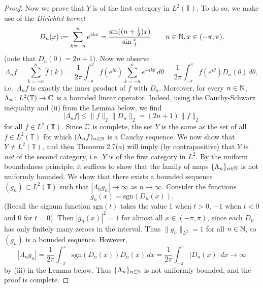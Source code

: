 \begin{proof}
	Now we prove that $Y$ is of the first category in $L^2(\mathbb{T})$. To do so, we make use of the \emph{Dirichlet kernel}
	\begin{equation*}
		D_n(x) := \sum_{k=-n}^n e^{ikx} = \frac{\sin ((n+\tfrac{1}{2})x)}{\sin \tfrac{x}{2}} \qquad n \in \mathbb{N}, x \in (-\pi,\pi).
	\end{equation*}
	(note that $D_n(0) = 2n+1$). Now we observe
	\begin{equation*}
		\Lambda_n f = \sum_{k=-n}^n \hat{f}(k) = \frac{1}{2\pi} \int_{-\pi}^\pi f(e^{i\theta}) \sum_{k=-n}^n e^{-ik\theta} \,d\theta = \frac{1}{2\pi}\int_{-\pi}^\pi f(e^{i\theta}) D_n(\theta) \,d\theta,
	\end{equation*}
	i.e.\ $\Lambda_n f$ is exactly the inner product of $f$ with $D_n$. Moreover, for every $n\in \mathbb{N}$, $\Lambda_n : L^2(\mathbb{T}) \to \mathbb{C}$ is a bounded linear operator. Indeed, using the Cauchy-Schwarz inequality and (ii) from the Lemma below, we find
	\begin{equation*}
		|\Lambda_n f| \le \|f\|_2 \|D_n\|_2 = (2n+1)\|f\|_2
	\end{equation*}
	for all $f \in L^2(\mathbb{T})$. Since $\mathbb{C}$ is complete, the set $Y$ is the same as the set of all $f \in L^2(\mathbb{T})$ for which $(\Lambda_n f)_{n\in\mathbb{N}}$ is a Cauchy sequence. We now show that $Y \ne L^2(\mathbb{T})$, and then Theorem 2.7(a) will imply (by contrapositive) that $Y$ is \emph{not} of the second category, i.e.\ $Y$ is of the first category in $L^2$. By the uniform boundedness principle, it suffices to show that the family of maps $\{\Lambda_n\}_{n \in \mathbb{N}}$ is not uniformly bounded. We show that there exists a bounded sequence $(g_n) \subset L^2(\mathbb{T})$ such that $|\Lambda_n g_n| \to \infty$ as $n\to\infty$. Consider the functions
	\begin{equation*}
		g_n(x) = \text{sgn}(D_n(x)).
	\end{equation*}
	(Recall the signum function $\text{sgn}(t)$ takes the value 1 when $t>0$, $-1$ when $t<0$ and 0 for $t=0$). Then $|g_n(x)|^2 = 1$ for almost all $x\in(-\pi,\pi)$, since each $D_n$ has only finitely many zeroes in the interval. Thus $\|g_n\|_{L^2} = 1$ for all $n\in\mathbb{N}$, so $(g_n)$ is a bounded sequence. However,
	\begin{equation*}
		|\Lambda_n g_n| = \frac{1}{2\pi}\int_{-\pi}^\pi \text{sgn}(D_n(x))D_n(x) \,dx = \frac{1}{2\pi}\int_{-\pi}^\pi |D_n(x)|\,dx \to \infty
	\end{equation*}
	by (iii) in the Lemma below. Thus $\{\Lambda_n\}_{n\in\mathbb{N}}$ is not uniformly bounded, and the proof is complete.
\end{proof}

